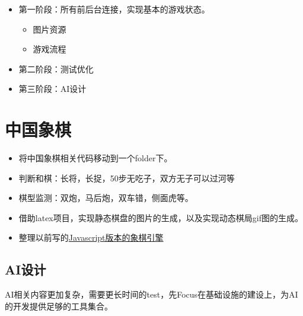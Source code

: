 \documentclass[export, 12pt, letterpaper]{ctexrep}
\begin{document}
\begin{itemize}
\item{ 第一阶段：所有前后台连接，实现基本的游戏状态。
\begin{itemize}
\item{ 图片资源 }
\item{ 游戏流程 }
\end{itemize}
 }
\item{ 第二阶段：测试优化 }
\item{ 第三阶段：AI设计 }
\end{itemize}



\section{中国象棋}


\begin{itemize}
\item{ 将中国象棋相关代码移动到一个folder下。 }
\item{ 判断和棋：长将，长捉，50步无吃子，双方无子可以过河等 }
\item{ 棋型监测：双炮，马后炮，双车错，侧面虎等。 }
\item{ 借助latex项目，实现静态棋盘的图片的生成，以及实现动态棋局gif图的生成。 }
\item{ 整理以前写的\href{https://github.com/JimmyFromSYSU/ChineseChess}{Javascript版本的象棋引擎} }
\end{itemize}


\subsection{AI设计}

AI相关内容更加复杂，需要更长时间的test，先Focus在基础设施的建设上，为AI的开发提供足够的工具集合。
\end{document}
